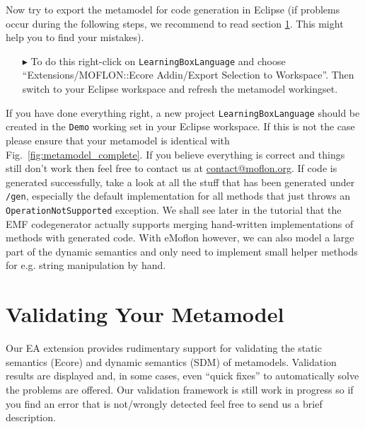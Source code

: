 Now try to export the metamodel for code generation in Eclipse (if problems occur during the following steps, we recommend to read section \ref{sect:validating}. This might help you to find your mistakes).

\begin{enumerate}
\item[$\blacktriangleright$] To do this right-click on \texttt{LearningBoxLanguage} and choose ``Extensions/MOFLON::Ecore Addin/Export Selection to Workspace''.
Then switch to your Eclipse work\-space and refresh the metamodel workingset.
\end{enumerate}


If you have done everything right, a new project \texttt{LearningBoxLanguage} should be created in the \texttt{Demo} working set in your Eclipse workspace.
If this is not the case please ensure that your metamodel is identical with Fig.~\ref{fig:metamodel_complete}.
If you believe everything is correct and things still don't work then feel free to contact us at \href{mailto:contact@moflon.org}{contact@moflon.org}.
If code is generated successfully, take a look at all the stuff that has been generated under \texttt{/gen}, especially the default  implementation for all methods that just throws an  \texttt{OperationNotSupported} exception.
We shall see later in the tutorial  that the EMF codegenerator actually supports merging hand-written implementations of methods with generated code.
With eMoflon however, we can also model a large part of the dynamic semantics and only need to implement small helper methods for e.g. string manipulation by hand.

\section{Validating Your Metamodel}
\label{sect:validating}


Our EA extension provides rudimentary support for validating the static semantics (Ecore) and dynamic semantics (SDM) of metamodels.
Validation results are displayed and, in some cases, even ``quick fixes'' to automatically solve the problems are offered.
Our validation framework is still work in progress so if you find an error that is not/wrongly detected feel free to send us a brief description.

